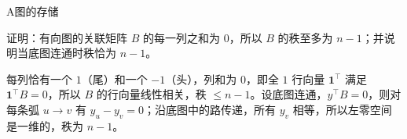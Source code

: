 \begin{exercises}{A}{图的存储}
\item\label{ex:graph-storage:A4} 证明：有向图的关联矩阵 $B$ 的每一列之和为 $0$，所以 $B$ 的秩至多为 $n-1$；并说明当底图连通时秩恰为 $n-1$。
\begin{solution}
每列恰有一个 $1$（尾）和一个 $-1$（头），列和为 $0$，即全 $1$ 行向量 $\mathbf 1^\top$ 满足 $\mathbf1^\top B=0$，所以 $B$ 的行向量线性相关，秩 $\leqslant n-1$。设底图连通，$y^\top B=0$，则对每条弧 $u\to v$ 有 $y_u-y_v=0$；沿底图中的路传递，所有 $y_v$ 相等，所以左零空间是一维的，秩为 $n-1$。
\end{solution}
\end{exercises}
